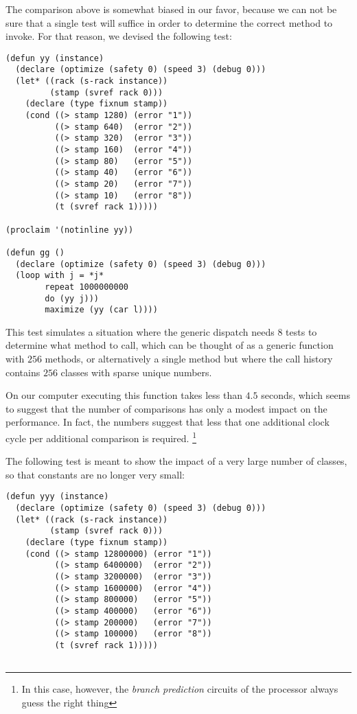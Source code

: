 {The comparison above is somewhat biased in our favor, because we can
not be sure that a single test will suffice in order to determine the
correct method to invoke.  For that reason, we devised the following
test: 

{\small\begin{verbatim}
(defun yy (instance)
  (declare (optimize (safety 0) (speed 3) (debug 0)))
  (let* ((rack (s-rack instance))
         (stamp (svref rack 0)))
    (declare (type fixnum stamp))
    (cond ((> stamp 1280) (error "1"))
          ((> stamp 640)  (error "2"))
          ((> stamp 320)  (error "3"))
          ((> stamp 160)  (error "4"))
          ((> stamp 80)   (error "5"))
          ((> stamp 40)   (error "6"))
          ((> stamp 20)   (error "7"))
          ((> stamp 10)   (error "8"))
          (t (svref rack 1)))))

(proclaim '(notinline yy))

(defun gg ()
  (declare (optimize (safety 0) (speed 3) (debug 0)))
  (loop with j = *j*
        repeat 1000000000
        do (yy j)))
        maximize (yy (car l))))
\end{verbatim}}

This test simulates a situation where the generic dispatch needs $8$
tests to determine what method to call, which can be thought of as a
generic function with $256$ methods, or alternatively a single method
but where the call history contains $256$ classes with sparse unique
numbers. 

On our computer executing this function takes less than $4.5$ seconds,
which seems to suggest that the number of comparisons has only a
modest impact on the performance.  In fact, the numbers suggest that
less that one additional clock cycle per additional comparison is
required.%
\footnote{In this case, however, the \emph{branch prediction} circuits
  of the processor always guess the right thing}

The following test is meant to show the impact of a very large number
of classes, so that constants are no longer very small:

{\small\begin{verbatim}
(defun yyy (instance)
  (declare (optimize (safety 0) (speed 3) (debug 0)))
  (let* ((rack (s-rack instance))
         (stamp (svref rack 0)))
    (declare (type fixnum stamp))
    (cond ((> stamp 12800000) (error "1"))
          ((> stamp 6400000)  (error "2"))
          ((> stamp 3200000)  (error "3"))
          ((> stamp 1600000)  (error "4"))
          ((> stamp 800000)   (error "5"))
          ((> stamp 400000)   (error "6"))
          ((> stamp 200000)   (error "7"))
          ((> stamp 100000)   (error "8"))
          (t (svref rack 1)))))


\end{verbatim}}}
